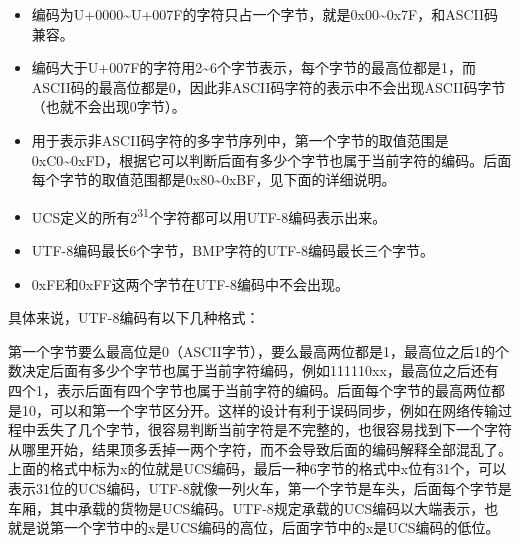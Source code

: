 \begin{itemize}

\item 编码为U+\BookSplit{}0000\textasciitilde{}\BookSplit{}U+\BookSplit{}007F的字符只占一个字节，就是0x00\textasciitilde{}\BookSplit{}0x7F，和ASCII码兼容。

\item 编码大于U+\BookSplit{}007F的字符用2\textasciitilde{}\BookSplit{}6个字节表示，每个字节的最高位都是1，而ASCII码的最高位都是0，因此非ASCII码字符的表示中不会出现ASCII码字节（也就不会出现0字节）。

\item 用于表示非ASCII码字符的多字节序列中，第一个字节的取值范围是0xC0\textasciitilde{}\BookSplit{}0xFD，根据它可以判断后面有多少个字节也属于当前字符的编码。后面每个字节的取值范围都是0x80\textasciitilde{}\BookSplit{}0xBF，见下面的详细说明。

\item UCS定义的所有2\textsuperscript{31}个字符都可以用UTF-8编码表示出来。

\item UTF-8编码最长6个字节，BMP字符的UTF-8编码最长三个字节。

\item 0xFE和0xFF这两个字节在UTF-8编码中不会出现。
\end{itemize}


具体来说，UTF-8编码有以下几种格式：


\begin{BookLiteral}
\end{BookLiteral}


第一个字节要么最高位是0（ASCII字节），要么最高两位都是1，最高位之后1的个数决定后面有多少个字节也属于当前字符编码，例如111110xx，最高位之后还有四个1，表示后面有四个字节也属于当前字符的编码。后面每个字节的最高两位都是10，可以和第一个字节区分开。这样的设计有利于误码同步，例如在网络传输过程中丢失了几个字节，很容易判断当前字符是不完整的，也很容易找到下一个字符从哪里开始，结果顶多丢掉一两个字符，而不会导致后面的编码解释全部混乱了。上面的格式中标为x的位就是UCS编码，最后一种6字节的格式中x位有31个，可以表示31位的UCS编码，UTF-8就像一列火车，第一个字节是车头，后面每个字节是车厢，其中承载的货物是UCS编码。UTF-8规定承载的UCS编码以大端表示，也就是说第一个字节中的x是UCS编码的高位，后面字节中的x是UCS编码的低位。



